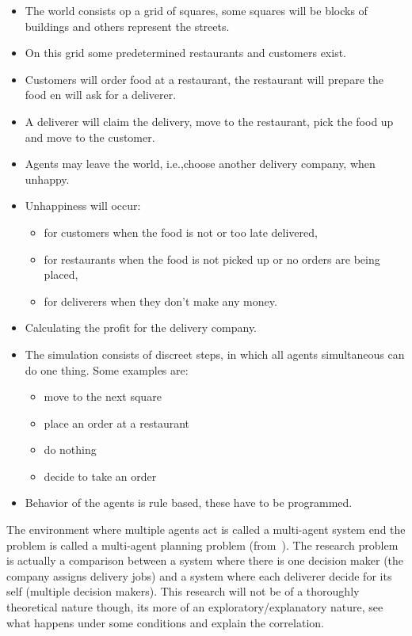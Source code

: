 \begin{itemize}
    \item   The world consists op a grid of squares, some squares will be blocks of buildings and others represent the streets.
    \item   On this grid some predetermined restaurants and customers exist.
    \item   Customers will order food at a restaurant, the restaurant will prepare the food en will ask for a deliverer.
    \item   A deliverer will claim the delivery, move to the restaurant, pick the food up and move to the customer.
    \item   Agents may leave the world, i.e.,choose another delivery company, when unhappy.
    \item   Unhappiness will occur:
    \begin{itemize}
        \item   for customers when the food is not or too late delivered,
        \item   for restaurants when the food is not picked up or no orders are being placed,
        \item   for deliverers when they don't make any money.
    \end{itemize}
    \item    Calculating the profit for the delivery company.
    \item    The simulation consists of discreet steps, in which all agents simultaneous can do one thing.
    Some examples are:
    \begin{itemize}
        \item  move to the next square
        \item  place an order at a restaurant
        \item  do nothing
        \item  decide to take an order
    \end{itemize}
    \item   Behavior of the agents is rule based, these have to be programmed.
\end{itemize}


The environment where multiple agents act is called a multi-agent system end the problem is called a multi-agent planning problem (from~\cite{russell2016artificial}).
The research problem is actually a comparison between a system where there is one decision maker (the company assigns delivery jobs) and a system where each deliverer decide for its self (multiple decision makers).
This research will not be of a thoroughly theoretical nature though, its more of an exploratory/explanatory nature, see what happens under some conditions and explain the correlation.





